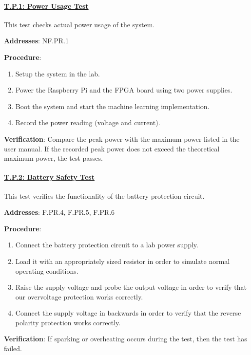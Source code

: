 \paragraph{\underline{T.P.1: Power Usage Test}}

This test checks actual power usage of the system.

\textbf{Addresses}: NF.PR.1

\textbf{Procedure}:
\begin{enumerate}[noitemsep]
    \item Setup the system in the lab.
    \item Power the Raspberry Pi and the FPGA board using two power supplies.
    \item Boot the system and start the machine learning implementation.
    \item Record the power reading (voltage and current).
\end{enumerate}

\textbf{Verification}: 
Compare the peak power with the maximum power listed in the user manual. If the recorded peak power does not exceed the theoretical maximum power, the test passes. 

%

\paragraph{\underline{T.P.2: Battery Safety Test}}

This test verifies the functionality of the battery protection circuit.

\textbf{Addresses}: F.PR.4, F.PR.5, F.PR.6

\textbf{Procedure}:
\begin{enumerate}[noitemsep]
    \item Connect the battery protection circuit to a lab power supply.
    \item Load it with an appropriately sized resistor in order to simulate normal operating conditions.
    \item Raise the supply voltage and probe the output voltage in order to verify that our overvoltage protection works correctly.
    \item Connect the supply voltage in backwards in order to verify that the reverse polarity protection works correctly.
\end{enumerate}

\textbf{Verification}: 
If sparking or overheating occurs during the test, then the test has failed.

